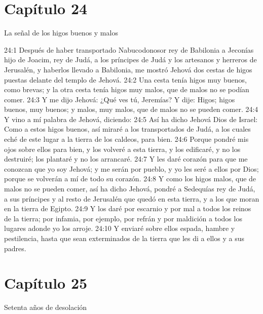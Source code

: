 \section*{Capítulo 24 }
La señal de los higos buenos y malos 
 
24:1 Después de haber transportado Nabucodonosor rey de Babilonia a Jeconías hijo de Joacim, rey de Judá, a los príncipes de Judá y los artesanos y herreros de Jerusalén, y haberlos llevado a Babilonia, me mostró Jehová dos cestas de higos puestas delante del templo de Jehová. 
24:2 Una cesta tenía higos muy buenos, como brevas; y la otra cesta tenía higos muy malos, que de malos no se podían comer. 
24:3 Y me dijo Jehová: ¿Qué ves tú, Jeremías? Y dije: Higos; higos buenos, muy buenos; y malos, muy malos, que de malos no se pueden comer. 
24:4 Y vino a mí palabra de Jehová, diciendo: 
24:5 Así ha dicho Jehová Dios de Israel: Como a estos higos buenos, así miraré a los transportados de Judá, a los cuales eché de este lugar a la tierra de los caldeos, para bien. 
24:6 Porque pondré mis ojos sobre ellos para bien, y los volveré a esta tierra, y los edificaré, y no los destruiré; los plantaré y no los arrancaré. 
24:7 Y les daré corazón para que me conozcan que yo soy Jehová; y me serán por pueblo, y yo les seré a ellos por Dios; porque se volverán a mí de todo su corazón. 
24:8 Y como los higos malos, que de malos no se pueden comer, así ha dicho Jehová, pondré a Sedequías rey de Judá, a sus príncipes y al resto de Jerusalén que quedó en esta tierra, y a los que moran en la tierra de Egipto. 
24:9 Y los daré por escarnio y por mal a todos los reinos de la tierra; por infamia, por ejemplo, por refrán y por maldición a todos los lugares adonde yo los arroje. 
24:10 Y enviaré sobre ellos espada, hambre y pestilencia, hasta que sean exterminados de la tierra que les di a ellos y a sus padres. 
\section*{Capítulo 25 }
Setenta años de desolación 
 
